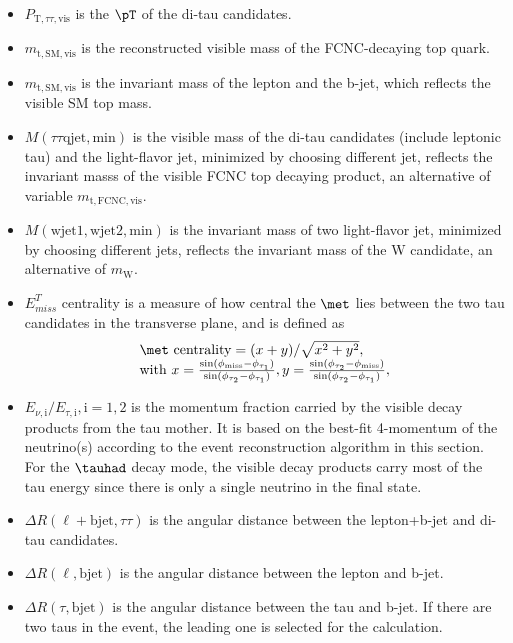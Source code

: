 \begin{itemize}
\item $P_{\text{T},\tau\tau,\text{vis}}$ is the $\pT$ of the di-tau candidates.
\item $m_{\text{t},\text{SM},\text{vis}}$ is the reconstructed visible mass of the FCNC-decaying top quark.
\item $m_{\text{t},\text{SM},\text{vis}}$ is the invariant mass of the lepton and the b-jet, which reflects the visible SM top mass.
\item $M(\tau\tau \text{qjet},\text{min})$ is the visible mass of the di-tau candidates (include leptonic tau) and the light-flavor jet, minimized by choosing different jet, reflects the invariant masss of the visible FCNC top decaying product, an alternative of variable $m_{\text{t},\text{FCNC},\text{vis}}$.
\item $M(\text{wjet1},\text{wjet2},\text{min})$ is the invariant mass of two light-flavor jet, minimized by choosing different jets, reflects the invariant mass of the W candidate, an alternative of $m_{\text{W}}$.
\item $E^{T}_{miss}$ centrality is a measure of how central the $\met$ lies between the two tau candidates in the transverse plane, and is defined as
\begin{eqnarray}
\begin{array}{l}
\met~\text{centrality} = {(x+y)}/{\sqrt{x^2+y^2}}, \\
\text{with}~x=\frac{\sin(\phi_{\text{miss}}-\phi_{\tau_1})}{\sin(\phi_{\tau_2}-\phi_{\tau_1})},  y=\frac{\sin(\phi_{\tau_2}-\phi_{\text{miss}})}{\sin(\phi_{\tau_2}-\phi_{\tau_1})} ,
\end{array}
\label{eq:eq3}
\end{eqnarray}
\item $E_{\nu,\text{i}}/E_{\tau,\text{i}},\text{i}=1,2$ is the momentum fraction carried by the visible decay products from the tau mother. It is based on the best-fit 4-momentum of the neutrino(s) according to the event reconstruction algorithm in this section. For the $\tauhad$ decay mode, the visible decay products carry most of the tau energy since there is only a single neutrino in the final state.%
\item $\Delta R(\ell+\text{bjet},\tau\tau)$ is the angular distance between the lepton+b-jet and di-tau candidates.
\item $\Delta R(\ell,\text{bjet})$ is the angular distance between the lepton and b-jet.
\item $\Delta R(\tau,\text{bjet})$ is the angular distance between the tau and b-jet. If there are two taus in the event, the leading one is selected for the calculation.

\end{itemize}
